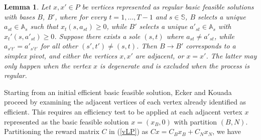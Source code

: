 \documentclass{article}
\newtheorem{lemma}[theorem]{Lemma}
\theoremstyle{definition}
\numberwithin{equation}{section}
\begin{document}
\begin{lemma} 
\label{pivot}
Let $x,x'\in P$ be vertices represented as regular basic feasible solutions with bases $B$, $B'$,
where for every $t=1,\dots,T-1$ and $s\in \mathbb{S}$, $B$ selects a unique $a_{st}\in \mathbb{A}_s$ such that
$x_t(s,a_{st}) \geq 0$, while $B'$ selects a unique $a'_{st}\in \mathbb{A}_s$ with $x_t'(s,a'_{st}) \geq 0$.
Suppose there exists a sole $(s,t)$ where $a_{st} \not = a'_{st}$, while $a_{s't'}=a'_{s't'}$ for all
other $(s',t') \not=(s,t)$. 
 Then $B \to B'$ corresponds to a simplex pivot, and either the  vertices $x,x'$ are  adjacent, or
$x=x'$. The latter may only happen when the vertex $x$ is degenerate and 
is excluded when the process is regular.
\end{lemma}


Starting from an initial efficient basic feasible solution, Ecker and Kouada \cite{6} proceed by examining the adjacent vertices of each vertex 
already identified as efficient. This requires an efficiency test to be applied at each adjacent vertex $x$ represented as the basic feasible solution $x=(x_B,0)$ with partition $(B,N)$. 
Partitioning the reward matrix $C$ in (\ref{vLP}) as $Cx = C_Bx_B + C_N x_N$, we have
 
\end{document}
